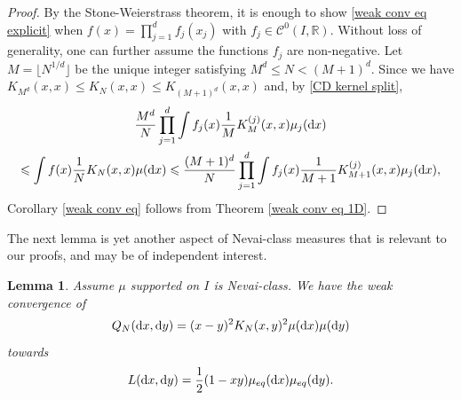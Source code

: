 \documentclass[a4paper,11pt]{article}
\numberwithin{equation}{section}
\newtheorem{lemma}[]{Lemma}
\theoremstyle{definition}
\newcommand{\eq}{\begin{equation}}
\newcommand{\qe}{\end{equation}}
\newcommand{\R}{\mathbb{R}}
\renewcommand{\leq}{\leqslant}
\renewcommand{\d}{ {\rm d}}
\begin{document}
\begin{proof} By the Stone-Weierstrass theorem, it is enough to show \eqref{weak
    conv eq explicit} when $f(x)= \prod_{j=1}^d f_j(x_j)$ with $f_j\in \mathscr C^0(I,\R)$. Without loss of generality, one can further assume the functions $f_j$ are non-negative. Let $M=\lfloor N^{1/d}\rfloor$ be the unique integer satisfying $M^d\leq N < (M+1)^d$. Since we have $K_{M^d}(x,x)\leq K_N(x,x)\leq K_{(M+1)^d}(x,x)$ and, by \eqref{CD kernel split},
\begin{multline}
\frac{M^d}{N}\prod_{j=1}^d\int f_j(x) \frac1{M} K_{M}^{(j)}(x,x)\mu_j(\d x)\\
\leq \int f(x) \frac1N K_N(x,x)\mu(\d x)\leq \frac{(M+1)^d}{N}\prod_{j=1}^d\int f_j(x) \frac1{M+1} K_{M+1}^{(j)}(x,x)\mu_j(\d x),
\end{multline}
Corollary \ref{weak conv eq} follows from Theorem \ref{weak conv eq 1D}.
\end{proof}

The next lemma is yet another aspect of Nevai-class measures that is relevant to our
proofs, and may be of independent interest.
\begin{lemma}
\label{convergence CD out diag}
Assume $\mu$ supported on $I$ is Nevai-class. We have the weak convergence of
\eq
\label{LN d=1}
Q_N(\d x,\d y)=(x-y)^2K_N(x,y)^2\mu(\d x)\mu(\d y)
\qe
towards
\eq
\label{L d=1}
L(\d x,\d y)=\frac 1 2 (1-xy)\mu_{eq}(\d x)\mu_{eq}(\d y).
\qe
\end{lemma}
\end{document}
